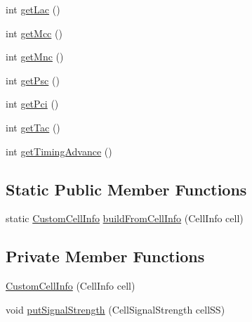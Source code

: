 \begin{DoxyCompactItemize}
\item 
int \hyperlink{classcom_1_1qualoutdoor_1_1recorder_1_1telephony_1_1CustomCellInfo_a2b125c8112c0e721a03d0d8103875b13}{get\-Lac} ()
\item 
int \hyperlink{classcom_1_1qualoutdoor_1_1recorder_1_1telephony_1_1CustomCellInfo_a99719532e25b5c6aad54f2bd8cf4d501}{get\-Mcc} ()
\item 
int \hyperlink{classcom_1_1qualoutdoor_1_1recorder_1_1telephony_1_1CustomCellInfo_a6d16d55ddbcecd9e9d572766b15cfec6}{get\-Mnc} ()
\item 
int \hyperlink{classcom_1_1qualoutdoor_1_1recorder_1_1telephony_1_1CustomCellInfo_a0a100d98e502e0f0d2cc804952c1311e}{get\-Psc} ()
\item 
int \hyperlink{classcom_1_1qualoutdoor_1_1recorder_1_1telephony_1_1CustomCellInfo_a8d403f02347f23e0c8b3bf842b904265}{get\-Pci} ()
\item 
int \hyperlink{classcom_1_1qualoutdoor_1_1recorder_1_1telephony_1_1CustomCellInfo_a892d670fa07339288766a151b9da2129}{get\-Tac} ()
\item 
int \hyperlink{classcom_1_1qualoutdoor_1_1recorder_1_1telephony_1_1CustomCellInfo_abae9d77a5f1f6f451aabb43359c2c39a}{get\-Timing\-Advance} ()
\end{DoxyCompactItemize}
\subsection*{Static Public Member Functions}
\begin{DoxyCompactItemize}
\item 
static \hyperlink{classcom_1_1qualoutdoor_1_1recorder_1_1telephony_1_1CustomCellInfo}{Custom\-Cell\-Info} \hyperlink{classcom_1_1qualoutdoor_1_1recorder_1_1telephony_1_1CustomCellInfo_a361d82a592568ef3a648a4e2273fbc84}{build\-From\-Cell\-Info} (Cell\-Info cell)
\end{DoxyCompactItemize}
\subsection*{Private Member Functions}
\begin{DoxyCompactItemize}
\item 
\hyperlink{classcom_1_1qualoutdoor_1_1recorder_1_1telephony_1_1CustomCellInfo_ad28c67a38f2c50d99858da70b2c7744e}{Custom\-Cell\-Info} (Cell\-Info cell)
\item 
void \hyperlink{classcom_1_1qualoutdoor_1_1recorder_1_1telephony_1_1CustomCellInfo_ad2bf09c37f3f7580f67e42cbb5a7aed7}{put\-Signal\-Strength} (Cell\-Signal\-Strength cell\-S\-S)
\end{DoxyCompactItemize}
